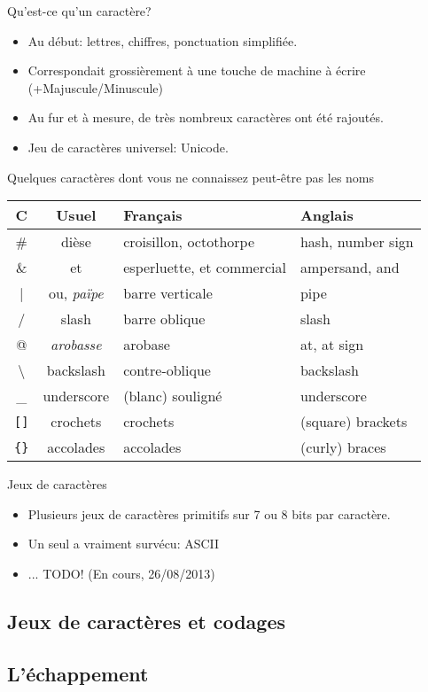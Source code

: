 \begin{frame}[fragile]{Qu'est-ce qu'un caractère?}
  \begin{itemize}
  \item Au début: lettres, chiffres, ponctuation simplifiée.
  \item[\dialogsystem] Correspondait grossièrement à une touche de
    machine à écrire (+Majuscule/Minuscule)
  \item Au fur et à mesure, de très nombreux caractères ont été rajoutés.
  \item Jeu de caractères universel: Unicode.
  \end{itemize}
  \begin{block}{Quelques caractères dont vous ne connaissez peut-être pas les noms}
    \begin{tabular}{>{\ttfamily}ccll}
      C & Usuel & Français & Anglais\\\hline
      \# & dièse & croisillon, octothorpe & hash, number sign\\
      \& & et & esperluette, et commercial & ampersand, and\\
      | & ou, \emph{païpe} & barre verticale & pipe\\
      / & slash & barre oblique & slash\\
      @ & \emph{arobasse} & arobase & at, at sign\\
      \textbackslash & backslash & contre-oblique & backslash\\
      \_ & underscore & (blanc) souligné & underscore\\
      \verb|[]| & crochets & crochets & (square) brackets\\
      \verb|{}| & accolades & accolades & (curly) braces\\
    \end{tabular}
  \end{block}
\end{frame}
\begin{frame}[label=jeucaractere]{Jeux de caractères}
  \begin{itemize}
  \item Plusieurs jeux de caractères primitifs sur 7 ou 8 bits par caractère.
  \item Un seul a vraiment survécu: ASCII    \begin{presentationonly}\hfill\hyperlink{ascii}{}\end{presentationonly}
  \item ... TODO! (En cours, 26/08/2013)

  \end{itemize}
\end{frame}
\subsection{Jeux de caractères et codages}
\subsection{L'échappement}

